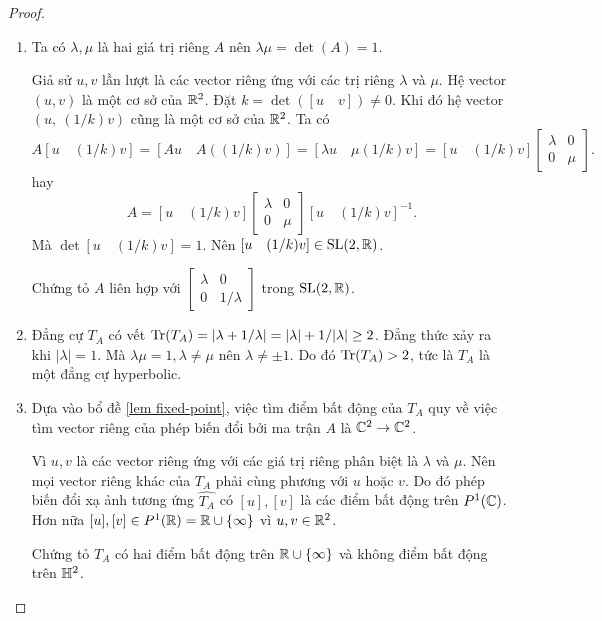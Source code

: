 \begin{proof}
    \begin{enumerate}
        \item Ta có $\lambda, \mu$ là hai giá trị riêng $A$ nên $\lambda \mu = \det(A) = 1$. 
        
        Giả sử $u, v$ lần lượt là các vector riêng ứng với các trị riêng $\lambda$ và $\mu$. Hệ vector $(u,v)$ là một cơ sở của $\mathbb{R}^2$. Đặt $k = \det([u\quad v]) \neq 0$. Khi đó hệ vector $(u,~(1/k)v)$ cũng là một cơ sở của $\mathbb{R}^2$. 
        Ta có
        \[A[u\quad (1/k) v] = [Au \quad A((1/k)v)] = [\lambda u \quad \mu (1/k)v] = [u\quad (1/k) v]\begin{bmatrix}
            \lambda & 0\\
            0 & \mu
        \end{bmatrix}.\]
        hay \[A = [u\quad (1/k) v]\begin{bmatrix}
            \lambda & 0\\
            0 & \mu
        \end{bmatrix}[u\quad (1/k) v]^{-1}. \]
        Mà $\det[u\quad (1/k) v] = 1$. Nên $[u\quad (1/k) v] \in \operatorname{SL}(2,\mathbb{R})$. 
        
        Chứng tỏ $A$ liên hợp với $\begin{bmatrix}
            \lambda & 0\\
            0 & 1/\lambda
        \end{bmatrix}$ trong $\operatorname{SL}(2,\mathbb{R})$.
        
        \item Đẳng cự $T_A$ có vết $\operatorname{Tr}(T_A) = |\lambda +1/\lambda| = |\lambda| + 1/|\lambda| \geq 2$. Đẳng thức xảy ra khi $|\lambda| = 1$. Mà $\lambda \mu = 1, \lambda\neq \mu$ nên $\lambda \neq \pm 1$. Do đó $\operatorname{Tr}(T_A) >2$, tức là $T_A$ là một đẳng cự hyperbolic.
        
        \item Dựa vào bổ đề \ref{lem fixed-point}, việc tìm điểm bất động của $T_A$ quy về việc tìm vector riêng của phép biến đổi bởi ma trận $A$ là $\mathbb{C}^2\to \mathbb{C}^2$.

        Vì $u,v$ là các vector riêng ứng với các giá trị riêng phân biệt là $\lambda$ và $\mu$. Nên mọi vector riêng khác của $T_A$ phải cùng phương với $u$ hoặc $v$. Do đó phép biến đổi xạ ảnh tương ứng $\widehat{T_A}$ có $[u],[v]$ là các điểm bất động trên $P^1(\mathbb{C})$. Hơn nữa $[u],[v] \in P^1(\mathbb{R})= \mathbb{R} \cup \{\infty\}$ vì $u,v \in \mathbb{R}^2$. 
        
        Chứng tỏ $T_A$ có hai điểm bất động trên $\mathbb{R} \cup \{\infty\}$ và không điểm bất động trên $\mathbb{H}^2$.
    \end{enumerate}
\end{proof}
